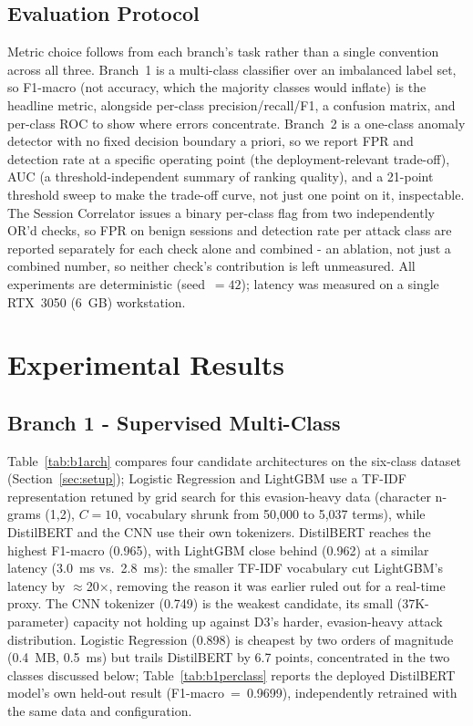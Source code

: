 \documentclass[conference]{IEEEtran}
\begin{document}
\subsection{Evaluation Protocol}
Metric choice follows from each branch's task rather than a single convention across all three. Branch~1 is a multi-class classifier over an imbalanced label set, so F1-macro (not accuracy, which the majority classes would inflate) is the headline metric, alongside per-class precision/recall/F1, a confusion matrix, and per-class ROC to show where errors concentrate. Branch~2 is a one-class anomaly detector with no fixed decision boundary a priori, so we report FPR and detection rate at a specific operating point (the deployment-relevant trade-off), AUC (a threshold-independent summary of ranking quality), and a 21-point threshold sweep to make the trade-off curve, not just one point on it, inspectable. The Session Correlator issues a binary per-class flag from two independently OR'd checks, so FPR on benign sessions and detection rate per attack class are reported separately for each check alone and combined - an ablation, not just a combined number, so neither check's contribution is left unmeasured. All experiments are deterministic (seed~$=42$); latency was measured on a single RTX~3050 (6~GB) workstation.

\section{Experimental Results}\label{sec:results}

\subsection{Branch 1 - Supervised Multi-Class}
Table~\ref{tab:b1arch} compares four candidate architectures on the six-class dataset (Section~\ref{sec:setup}); Logistic Regression and LightGBM use a TF-IDF representation retuned by grid search for this evasion-heavy data (character n-grams (1,2), $C=10$, vocabulary shrunk from 50{,}000 to 5{,}037 terms), while DistilBERT and the CNN use their own tokenizers. DistilBERT reaches the highest F1-macro (0.965), with LightGBM close behind (0.962) at a similar latency (3.0~ms vs.\ 2.8~ms): the smaller TF-IDF vocabulary cut LightGBM's latency by $\approx$20$\times$, removing the reason it was earlier ruled out for a real-time proxy. The CNN tokenizer (0.749) is the weakest candidate, its small (37K-parameter) capacity not holding up against D3's harder, evasion-heavy attack distribution. Logistic Regression (0.898) is cheapest by two orders of magnitude (0.4~MB, 0.5~ms) but trails DistilBERT by 6.7 points, concentrated in the two classes discussed below; Table~\ref{tab:b1perclass} reports the deployed DistilBERT model's own held-out result (F1-macro~=~0.9699), independently retrained with the same data and configuration.
\end{document}
